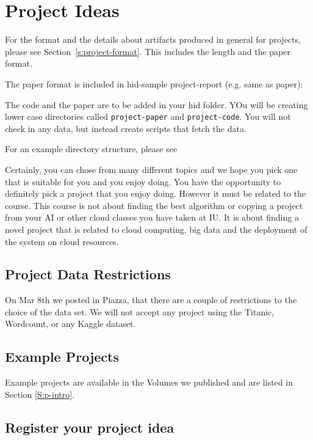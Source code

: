 \section{Project Ideas}
\label{s:project-ideas}

For the format and the details about artifacts produced in general for
projects, please see Section~\ref{s:project-format}. This includes the
length and the paper format.

The	paper format is included in hid-sample project-report (e.g. same as paper):


The code and the paper are to be added in your hid folder. YOu will be
creating lower case directories called \verb|project-paper| and
\verb|project-code|. You will not check in any data, but instead
create scripts that fetch the data.

For an example directory structure, please see 


Certainly, you can chose from many different topics and we hope you
pick one that is suitable for you and you enjoy doing. You have the
opportunity to definitely pick a project that you enjoy doing. However
it must be related to the course. This course is not about finding the
best algorithm or copying a project from your AI or other cloud
classes you have taken at IU. It is about finding a novel project that
is related to cloud computing, big data and the deployment of the
system on cloud resources.

\subsection{Project Data Restrictions}

On Mar 8th we posted in Piazza, that there are  a couple of
restrictions to the choice of the data set. We will not accept any
project using the Titanic, Wordcount, or any Kaggle dataset. 


\subsection{Example Projects}

Example projects are available in the Volumes we published and are
listed in Section \ref{S:p-intro}.

\subsection{Register your project idea}


